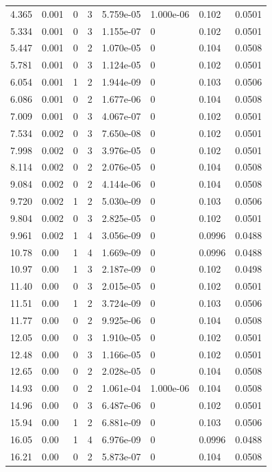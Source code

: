 \documentclass[preview]{standalone}
\begin{document}
{{\begin{tabular}{L{1.2cm}C{1.2cm} C{0.3cm}C{0.5cm} C{1.4cm}C{1.4cm} C{1.4cm}C{1.4cm}}
  4.365  &  0.001  & 0     &  3 &  5.759e-05  & 1.000e-06  & 0.102 &  0.0501   \\ 
  5.334  &  0.001  & 0     &  3 &  1.155e-07  & 0  & 0.102 &  0.0501   \\ 
  5.447  &  0.001  & 0     &  2 &  1.070e-05  & 0  & 0.104 &  0.0508   \\ 
  5.781  &  0.001  & 0     &  3 &  1.124e-05  & 0  & 0.102 &  0.0501   \\ 
  6.054  &  0.001  & 1     &  2 &  1.944e-09  & 0  & 0.103 &  0.0506   \\ 
  6.086  &  0.001  & 0     &  2 &  1.677e-06  & 0  & 0.104 &  0.0508   \\ 
  7.009  &  0.001  & 0     &  3 &  4.067e-07  & 0  & 0.102 &  0.0501   \\ 
  7.534  &  0.002  & 0     &  3 &  7.650e-08  & 0  & 0.102 &  0.0501   \\ 
  7.998  &  0.002  & 0     &  3 &  3.976e-05  & 0  & 0.102 &  0.0501   \\ 
  8.114  &  0.002  & 0     &  2 &  2.076e-05  & 0  & 0.104 &  0.0508   \\ 
  9.084  &  0.002  & 0     &  2 &  4.144e-06  & 0  & 0.104 &  0.0508   \\ 
  9.720  &  0.002  & 1     &  2 &  5.030e-09  & 0  & 0.103 &  0.0506   \\ 
  9.804  &  0.002  & 0     &  3 &  2.825e-05  & 0  & 0.102 &  0.0501   \\ 
  9.961  &  0.002  & 1     &  4 &  3.056e-09  & 0  & 0.0996 &  0.0488   \\ 
  10.78  &  0.00  & 1     &  4 &  1.669e-09  & 0  & 0.0996 &  0.0488   \\ 
  10.97  &  0.00  & 1     &  3 &  2.187e-09  & 0  & 0.102 &  0.0498   \\ 
  11.40  &  0.00  & 0     &  3 &  2.015e-05  & 0  & 0.102 &  0.0501   \\ 
  11.51  &  0.00  & 1     &  2 &  3.724e-09  & 0  & 0.103 &  0.0506   \\ 
  11.77  &  0.00  & 0     &  2 &  9.925e-06  & 0  & 0.104 &  0.0508   \\ 
  12.05  &  0.00  & 0     &  3 &  1.910e-05  & 0  & 0.102 &  0.0501   \\ 
  12.48  &  0.00  & 0     &  3 &  1.166e-05  & 0  & 0.102 &  0.0501   \\ 
  12.65  &  0.00  & 0     &  2 &  2.028e-05  & 0  & 0.104 &  0.0508   \\ 
  14.93  &  0.00  & 0     &  2 &  1.061e-04  & 1.000e-06  & 0.104 &  0.0508   \\ 
  14.96  &  0.00  & 0     &  3 &  6.487e-06  & 0  & 0.102 &  0.0501   \\ 
  15.94  &  0.00  & 1     &  2 &  6.881e-09  & 0  & 0.103 &  0.0506   \\ 
  16.05  &  0.00  & 1     &  4 &  6.976e-09  & 0  & 0.0996 &  0.0488   \\ 
  16.21  &  0.00  & 0     &  2 &  5.873e-07  & 0  & 0.104 &  0.0508   \\ 
\hline 
\end{tabular} 

}}
\end{document}
